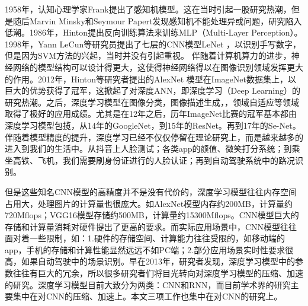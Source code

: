 \documentclass[ pdftex, oneside, master]{NJUthesis}
\begin{document}
1958年，认知心理学家Frank提出了感知机模型。这在当时引起一股研究热潮，但是随后Marvin Minsky和Seymour Papert发现感知机不能处理异或问题，研究陷入低潮。1986年，Hinton提出反向训练算法来训练MLP（Multi-Layer Perception）。1998年，Yann LeCun等研究员提出了七层的CNN模型LeNet \cite{lenet}，以识别手写数字，但是因为SVM方法的兴起，当时并没有引起重视。
伴随着计算机算力的进步，神经网络的模型结构可以设计得更大，这使得神经网络得以在图像识别领域发挥更大的作用。2012年，Hinton等研究者提出的AlexNet \cite{alexnet}模型在ImageNet数据集上，以巨大的优势获得了冠军，这掀起了对深度ANN，即深度学习（Deep Learning）的研究热潮。之后，深度学习模型在图像分类\cite{2012imagenet}，图像描述生成\cite{2015show}，\cite{2015deep}，领域自适应\cite{2011domain}等领域取得了极好的应用成绩。尤其是在12年之后，历年ImageNet比赛的冠军基本都由深度学习模型包揽，从14年的GoogleNet\cite{googlenet}，到15年的ResNet\cite{resnet}。再到17年的Se-Net\cite{senet}。伴随着模型精度的提升，深度学习已经不仅仅停留在理论研究上，而是越来越多的进入到我们的生活中。从抖音上人脸测试；各类app的颜值、微笑打分系统；到乘坐高铁、飞机，我们需要刷身份证进行的人脸认证；再到自动驾驶系统中的路况识别。

但是这些知名CNN模型的高精度并不是没有代价的，深度学习模型往往内存空间占用大，处理图片的计算量也很庞大。如AlexNet模型内存约200MB，计算量约720Mflops；VGG16模型存储约500MB，计算量约15300Mflops。CNN模型巨大的存储和计算量消耗对硬件提出了更高的要求。而实际应用场景中，CNN模型往往面对着一些限制，如：1.硬件的存储空间、计算能力往往受限的，如移动端的app，手机的存储和计算性能显然远远不如PC端；2.部分应用场景实时性要求很高，如果自动驾驶中的场景识别。早在2013年，研究者\cite{predicting}发现，深度学习模型中的参数往往有巨大的冗余，所以很多研究者们将目光转向对深度学习模型的压缩、加速的研究。深度学习模型目前大致分为两类：CNN和RNN，而目前学术界的研究主要集中在对CNN的压缩、加速上。本文三项工作也集中在对CNN的研究上。
\end{document}
